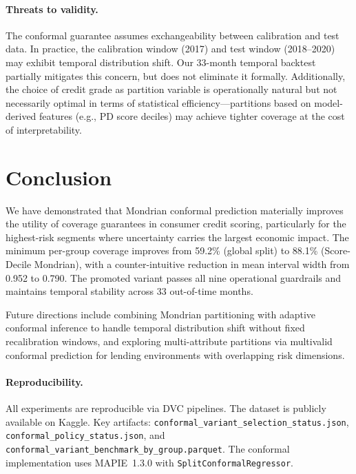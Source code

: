 \documentclass[pmlr]{jmlr}
\begin{document}
\paragraph{Threats to validity.}
The conformal guarantee assumes exchangeability between calibration and test
data.  In practice, the calibration window (2017) and test window (2018--2020)
may exhibit temporal distribution shift.  Our 33-month temporal backtest
partially mitigates this concern, but does not eliminate it formally.
Additionally, the choice of credit grade as partition variable is
operationally natural but not necessarily optimal in terms of statistical
efficiency---partitions based on model-derived features (e.g., PD score
deciles) may achieve tighter coverage at the cost of interpretability.

\section{Conclusion}
\label{sec:conclusion}

We have demonstrated that Mondrian conformal prediction materially improves
the utility of coverage guarantees in consumer credit scoring, particularly
for the highest-risk segments where uncertainty carries the largest economic
impact.  The minimum per-group coverage improves from 59.2\% (global split) to
88.1\% (Score-Decile Mondrian), with a counter-intuitive reduction in mean
interval width from 0.952 to 0.790.  The promoted variant passes all nine
operational guardrails and maintains temporal stability across 33 out-of-time
months.

Future directions include combining Mondrian partitioning with adaptive
conformal inference \citep{gibbs2021aci} to handle temporal distribution shift
without fixed recalibration windows, and exploring multi-attribute partitions
via multivalid conformal prediction \citep{gopalan2022} for lending
environments with overlapping risk dimensions.

\paragraph{Reproducibility.}
All experiments are reproducible via DVC pipelines.  The dataset is publicly
available on Kaggle.  Key artifacts: \texttt{conformal\_variant\_selection\_status.json},
\texttt{conformal\_policy\_status.json}, and
\texttt{conformal\_variant\_benchmark\_by\_group.parquet}.
The conformal implementation uses MAPIE~1.3.0 with
\texttt{SplitConformalRegressor}.
\end{document}
